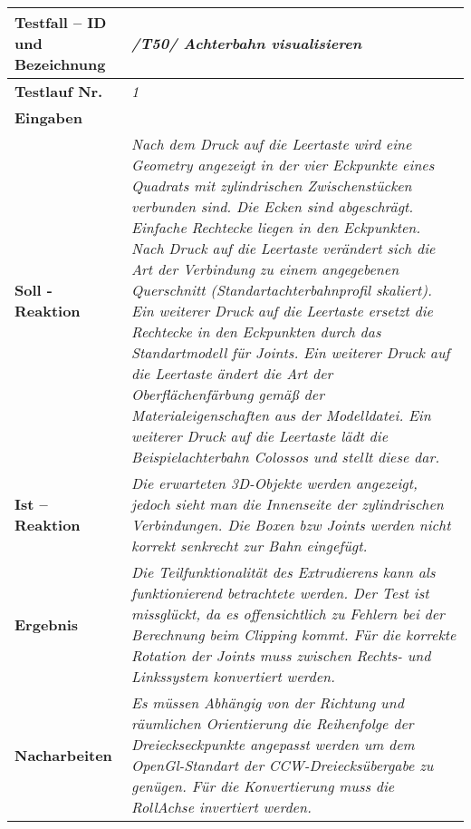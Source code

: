 \begin{longtable}{|p{7cm}|p{10cm}|}
\hline
\textbf{Testfall -- ID und Bezeichnung} & \textit{ /T50/ Achterbahn visualisieren} \\
\hline
\textbf{Testlauf Nr.} & \textit{1} \\
\hline
\textbf{Eingaben} & \textit{} \\
\hline
\textbf{Soll - Reaktion} & \textit{Nach dem Druck auf die Leertaste wird eine Geometry angezeigt in der vier Eckpunkte eines Quadrats mit zylindrischen Zwischenstücken verbunden sind. Die Ecken sind abgeschrägt. Einfache Rechtecke liegen in den Eckpunkten.
Nach Druck auf die Leertaste verändert sich die Art der Verbindung zu einem angegebenen Querschnitt (Standartachterbahnprofil skaliert). Ein weiterer Druck auf die Leertaste ersetzt die Rechtecke in den Eckpunkten durch 
das Standartmodell für Joints. Ein weiterer Druck auf die Leertaste ändert die Art der Oberflächenfärbung gemäß der Materialeigenschaften aus der Modelldatei. Ein weiterer Druck auf die Leertaste lädt die Beispielachterbahn Colossos und stellt diese dar.
} \\
\hline
\textbf{Ist -- Reaktion} & \textit{Die erwarteten 3D-Objekte werden angezeigt, jedoch sieht man die Innenseite der zylindrischen Verbindungen. Die Boxen bzw Joints werden nicht korrekt senkrecht zur Bahn eingefügt.} \\
\hline
\textbf{Ergebnis} & \textit{Die Teilfunktionalität des Extrudierens kann als funktionierend betrachtete werden. Der Test ist missglückt, da es offensichtlich zu Fehlern bei der Berechnung beim Clipping kommt. 
Für die korrekte Rotation der Joints muss zwischen Rechts- und Linkssystem konvertiert werden.} \\
\hline
\textbf{Nacharbeiten } & \textit{Es müssen Abhängig von der Richtung und räumlichen Orientierung die Reihenfolge der Dreieckseckpunkte angepasst werden um dem OpenGl-Standart der CCW-Dreiecksübergabe zu genügen.
Für die Konvertierung muss die RollAchse invertiert werden.} \\
\hline
 \end{longtable}


